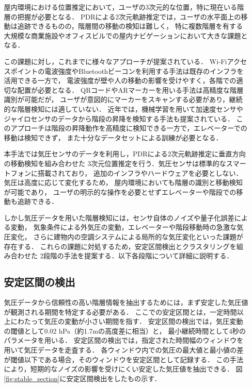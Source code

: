 



屋内環境における位置推定において，ユーザの3次元的な位置，特に現在いる階層の把握が必要となる．
PDRによる2次元軌跡推定では，ユーザの水平面上の移動は追跡できるものの，階層間の移動の検知は難しく，
特に複数階層を有する大規模な商業施設やオフィスビルでの屋内ナビゲーションにおいて大きな課題となる．

この課題に対し，これまでに様々なアプローチが提案されている．
Wi-Fiアクセスポイントの電波強度やBluetoothビーコンを利用する手法は既存のインフラを活用できる一方で，
電波強度が壁や人の移動の影響を受けやすく，各階での適切な配置が必要となる．
QRコードやARマーカーを用いる手法は高精度な階層識別が可能だが，
ユーザが意図的にマーカーをスキャンする必要があり，継続的な階層検知には適していない．
近年では，機械学習を用いて加速度センサやジャイロセンサのデータから階段の昇降を検知する手法も提案されている．
このアプローチは階段の昇降動作を高精度に検知できる一方で，エレベーターでの移動は検知できず，
また十分なデータセットによる訓練が必要となる．

本手法では気圧センサのデータを利用し，PDRによる2次元軌跡推定に垂直方向の移動検知を組み合わせた
3次元位置推定を行う．気圧センサは標準的なスマートフォンに搭載されており，
追加のインフラやハードウェアを必要としない．気圧は高度に応じて変化するため，
屋内環境においても階層の識別と移動検知が可能であり，
ユーザの明示的な操作を必要とせずエレベーターや階段での移動も追跡できる．

しかし気圧データを用いた階層検知には，センサ自体のノイズや量子化誤差による変動，
気象条件による外気圧の変動，エレベーターや階段移動時の急激な気圧変化，
さらに建物内の空調システムによる局所的な気圧変化といった課題が存在する．
これらの課題に対処するため，安定区間検出とクラスタリングを組み合わせた
2段階の手法を提案する．以下各段階について詳細に説明する．


\subsection{安定区間の検出}
気圧データから信頼性の高い階層情報を抽出するためには，まず安定した気圧値が観測される期間を特定する必要がある．
ここでの安定区間とは，一定時間以上にわたって気圧の変動が小さい期間を指す．
安定区間の検出では，気圧変動の閾値として0.02 hPa（約1.7mの高度差に相当）と，
最小継続時間として4秒のパラメータを用いる．
安定区間の検出では，指定された時間幅のウィンドウを用いて気圧データを走査する．
各ウィンドウ内での気圧の最大値と最小値の差が閾値以下である場合，そのウィンドウを安定区間として記録する．
この手法により，短期的なノイズの影響を受けにくい安定した気圧値を抽出できる．
図\ref{fig:stable_section}に安定区間検出をしたもの示す． %


